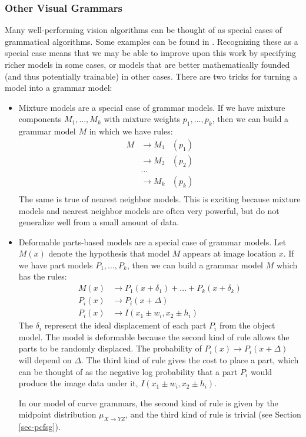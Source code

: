 \documentclass{article}
\begin{document}
\subsubsection{Other Visual Grammars}
\label{sec-other-grammars}

Many well-performing vision algorithms can be thought of as special
cases of grammatical algorithms. Some examples can be found in
\cite{pop, pictorial, grammar-tr}. Recognizing these as a special case
means that we may be able to improve upon this work by specifying
richer models in some cases, or models that are better mathematically
founded (and thus potentially trainable) in other cases. There are two
tricks for turning a model into a grammar model:
\begin{itemize}
\item Mixture models are a special case of grammar models. If we have
  mixture components $M_1,\dots,M_k$ with mixture weights
  $p_1,\dots,p_k$, then we can build a grammar model $M$ in which we
  have rules:
  \begin{align*}
    M &\to M_1 &(p_1)\\
     &\to M_2 &(p_2)\\
     &\dots&\\
     &\to M_k &(p_k)\\
  \end{align*}
  The same is true of nearest neighbor models. This is exciting
  because mixture models and nearest neighbor models are often very
  powerful, but do not generalize well from a small amount of data.

\item Deformable parts-based models are a special case of grammar
  models. Let $M(x)$ denote the hypothesis that model $M$ appears at
  image location $x$. If we have part models $P_1,\dots,P_k$, then we
  can build a grammar model $M$ which has the rules:
  \begin{align*}
M(x) &\to P_1(x + \delta_1) + \dots + P_k(x + \delta_k)\\
P_i(x) &\to P_i(x+\Delta)\\
P_i(x) &\to I(x_1 \pm w_i, x_2 \pm h_i)
  \end{align*}
  The $\delta_i$ represent the ideal displacement of each part $P_i$
  from the object model. The model is deformable because the second
  kind of rule allows the parts to be randomly displaced. The
  probability of $P_i(x) \to P_i(x+\Delta)$ will depend on
  $\Delta$. The third kind of rule gives the cost to place a part,
  which can be thought of as the negative log probability that a part
  $P_i$ would produce the image data under it, $I(x_1\pm w_i, x_2\pm
  h_i)$.

  In our model of curve grammars, the second kind of rule is given
  by the midpoint distribution $\mu_{X\to YZ}$, and the third kind of
  rule is trivial (see Section \ref{sec-pcfsg}).
\end{itemize}
\end{document}
